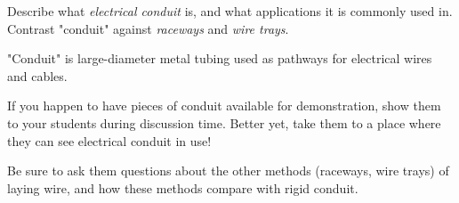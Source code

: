 

Describe what {\it electrical conduit} is, and what applications it is commonly used in.  Contrast "conduit" against {\it raceways} and {\it wire trays}.







"Conduit" is large-diameter metal tubing used as pathways for electrical wires and cables.







If you happen to have pieces of conduit available for demonstration, show them to your students during discussion time.  Better yet, take them to a place where they can see electrical conduit in use!

Be sure to ask them questions about the other methods (raceways, wire trays) of laying wire, and how these methods compare with rigid conduit.




